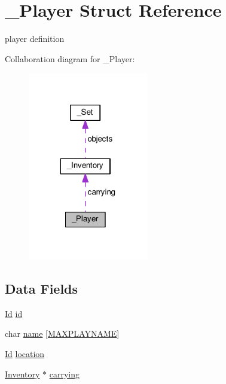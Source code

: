 \hypertarget{struct__Player}{}\section{\+\_\+\+Player Struct Reference}
\label{struct__Player}


player definition  




Collaboration diagram for \+\_\+\+Player\+:
\nopagebreak
\begin{figure}[H]
\begin{center}
\leavevmode
\includegraphics[width=149pt]{struct__Player__coll__graph}
\end{center}
\end{figure}
\subsection*{Data Fields}
\begin{DoxyCompactItemize}
\item 
\hyperlink{types_8h_a845e604fb28f7e3d97549da3448149d3}{Id} \hyperlink{struct__Player_a60d635cd063816a9c1bd873f4868bb90}{id}
\item 
char \hyperlink{struct__Player_ae3931f4219966e5a8b9fd2621f26956a}{name} \mbox{[}\hyperlink{player_8h_a5bb4369b60f4886b73026bb884053640}{M\+A\+X\+P\+L\+A\+Y\+N\+A\+ME}\mbox{]}
\item 
\hyperlink{types_8h_a845e604fb28f7e3d97549da3448149d3}{Id} \hyperlink{struct__Player_adbb6195d15b88f3f658e74274eff52d8}{location}
\item 
\hyperlink{inventory_8h_a2253bf64ac4ce6a9c1d6f39c0b0d32a3}{Inventory} $\ast$ \hyperlink{struct__Player_a816df014a3e27f7ef65b16007bc26b41}{carrying}
\end{DoxyCompactItemize}


